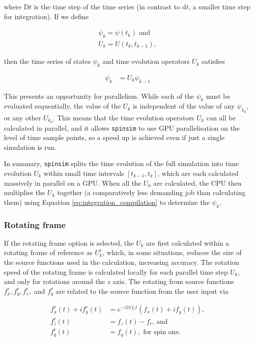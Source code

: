 \documentclass{jors}
\begin{document}
			where \(\mathrm{D}t\) is the time step of the time series (in contrast to \(\mathrm{d}t\), a smaller time step for integration). If we define

			\begin{align}
				\psi_k = \psi(t_k)\textrm{ and}\\
				U_k = U(t_{k}, t_{k-1}),
			\end{align}
			
			then the time series of states \(\psi_k\) and time evolution operators \(U_k\) satisfies

			\begin{align}
				\psi_k &= U_k\psi_{k-1}\label{eq:integration_compilation}
			\end{align}

			This presents an opportunity for parallelism. While each of the \(\psi_k\) must be evaluated sequentially, the value of the \(U_k\) is independent of the value of any \(\psi_{k_0}\), or any other \(U_{k_0}\). This means that the time evolution operators \(U_k\) can all be calculated in parallel, and it allows \texttt{spinsim} to use GPU parallelisation on the level of time sample points, so a speed up is achieved even if just a single simulation is run.

			In summary, \texttt{spinsim} splits the time evolution of the full simulation into time evolution \(U_k\) within small time intervals \([t_{k - 1}, t_{k}]\), which are each calculated massively in parallel on a GPU. When all the \(U_k\) are calculated, the CPU then multiplies the \(U_k\) together (a comparatively less demanding job than calculating them) using Equation \eqref{eq:integration_compilation} to determine the \(\psi_k\).

		\subsubsection*{Rotating frame}
			If the rotating frame option is selected, the \(U_k\) are first calculated within a rotating frame of reference as \(U^r_k\), which, in some situations, reduces the size of the source functions used in the calculation, increasing accuracy. The rotation speed of the rotating frame is calculated locally for each parallel time step \(U_k\), and only for rotations around the \(z\) axis. The rotating from source functions \(f^r_x, f^r_y, f^r_z,\) and \(f^r_q\) are related to the source function from the user input via
			
			\begin{align}
				f^r_x(t) + if^r_y(t) &= e^{-i 2\pi f_r t}(f_x(t) + if_y(t)),\\
				f^r_z(t) &= f_z(t) - f_r\textrm{, and}\\
				f^r_q(t) &= f_q(t), \textrm{ for spin one.}
			\end{align}
			
\end{document}
